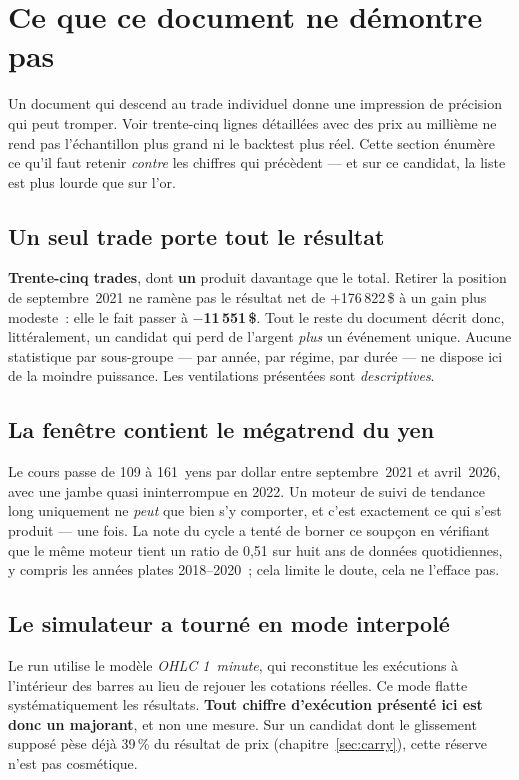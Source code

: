 \section{Ce que ce document ne démontre pas}
\label{sec:limites}

Un document qui descend au trade individuel donne une impression de précision
qui peut tromper. Voir trente-cinq lignes détaillées avec des prix au millième
ne rend pas l'échantillon plus grand ni le backtest plus réel. Cette section
énumère ce qu'il faut retenir \emph{contre} les chiffres qui précèdent --- et
sur ce candidat, la liste est plus lourde que sur l'or.

\subsection*{Un seul trade porte tout le résultat}

\textbf{Trente-cinq trades}, dont \textbf{un} produit davantage que le total.
Retirer la position de septembre~2021 ne ramène pas le résultat net de
$+$176\,822\,\$ à un gain plus modeste~: elle le fait passer à
\textbf{$-$11\,551\,\$}. Tout le reste du document décrit donc, littéralement,
un candidat qui perd de l'argent \emph{plus} un événement unique. Aucune
statistique par sous-groupe --- par année, par régime, par durée --- ne dispose
ici de la moindre puissance. Les ventilations présentées sont
\emph{descriptives}.

\subsection*{La fenêtre contient le mégatrend du yen}

Le cours passe de 109 à 161~yens par dollar entre septembre~2021 et
avril~2026, avec une jambe quasi ininterrompue en 2022. Un moteur de suivi de
tendance long uniquement ne \emph{peut} que bien s'y comporter, et c'est
exactement ce qui s'est produit --- une fois. La note du cycle a tenté de
borner ce soupçon en vérifiant que le même moteur tient un ratio de 0,51 sur
huit ans de données quotidiennes, y compris les années plates 2018--2020~; cela
limite le doute, cela ne l'efface pas.

\subsection*{Le simulateur a tourné en mode interpolé}

Le run utilise le modèle \emph{OHLC 1~minute}, qui reconstitue les exécutions à
l'intérieur des barres au lieu de rejouer les cotations réelles. Ce mode flatte
systématiquement les résultats. \textbf{Tout chiffre d'exécution présenté ici
est donc un majorant}, et non une mesure. Sur un candidat dont le glissement
supposé pèse déjà 39\,\% du résultat de prix (chapitre~\ref{sec:carry}), cette
réserve n'est pas cosmétique.

